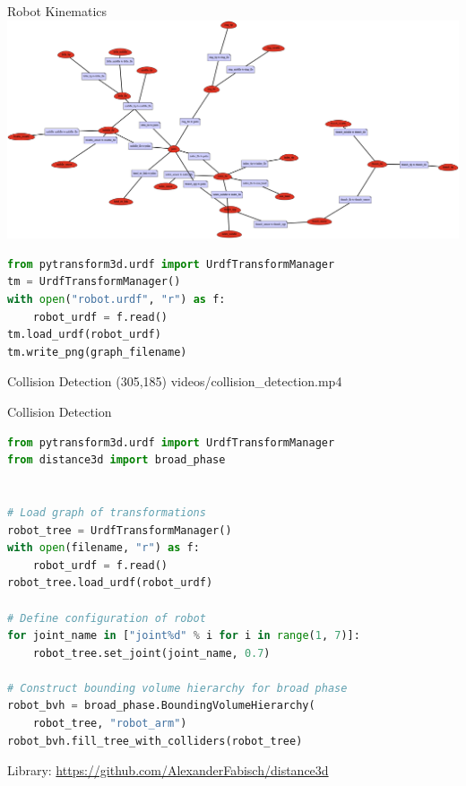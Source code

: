 \documentclass[14pt]{beamer}
\begin{document}
\begin{frame}[fragile]{Robot Kinematics}
\includegraphics[width=\textwidth]{images/embodiment_graph}
\begin{lstlisting}[language=Python]
from pytransform3d.urdf import UrdfTransformManager
tm = UrdfTransformManager()
with open("robot.urdf", "r") as f:
    robot_urdf = f.read()
tm.load_urdf(robot_urdf)
tm.write_png(graph_filename)
\end{lstlisting}
\end{frame}

\begin{frame}{Collision Detection}
\makebox(305,185){
{videos/collision_detection.mp4}}
\end{frame}

\begin{frame}[fragile]{Collision Detection}
\begin{lstlisting}[language=Python]
from pytransform3d.urdf import UrdfTransformManager
from distance3d import broad_phase


# Load graph of transformations
robot_tree = UrdfTransformManager()
with open(filename, "r") as f:
    robot_urdf = f.read()
robot_tree.load_urdf(robot_urdf)

# Define configuration of robot
for joint_name in ["joint%d" % i for i in range(1, 7)]:
    robot_tree.set_joint(joint_name, 0.7)

# Construct bounding volume hierarchy for broad phase
robot_bvh = broad_phase.BoundingVolumeHierarchy(
    robot_tree, "robot_arm")
robot_bvh.fill_tree_with_colliders(robot_tree)
\end{lstlisting}
{\footnotesize Library: \url{https://github.com/AlexanderFabisch/distance3d}}
\end{frame}
\end{document}
